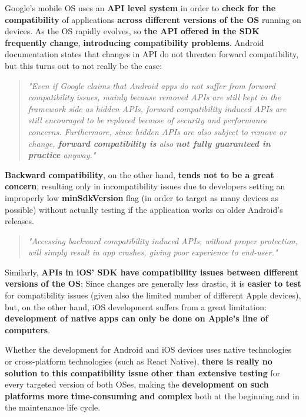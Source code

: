 Google's mobile OS uses an \textbf{API level system} in order to \textbf{check for the compatibility} of applications \textbf{across different versions of the OS} running on devices.
As the OS rapidly evolves, so \textbf{the API offered in the SDK frequently change}, \textbf{introducing compatibility problems}. Android documentation states that changes in API do not threaten forward compatibility, but this turns out to not really be the case:

\begin{quotation}
    \textit{"Even if Google claims that Android apps do not suffer from forward compatibility issues, mainly because removed APIs are still kept in the framework side as hidden APIs, forward compatibility induced APIs are still encouraged to be replaced because of security and performance concerns. Furthermore, since hidden APIs are also subject to remove or change, \textbf{forward compatibility is} also \textbf{not fully guaranteed in practice} anyway." \cite{automating_android_api_compatibility_issues}}
\end{quotation}

\textbf{Backward compatibility}, on the other hand, \textbf{tends not to be a great concern}, resulting only in incompatibility issues due to developers setting an improperly low \textbf{minSdkVersion} flag (in order to target as many devices as possible) without actually testing if the application works on older Android's releases.

\begin{quotation}
    \textit{"Accessing backward compatibility induced APIs, without proper protection, will simply result in app crashes, giving poor experience to end-user." \cite{automating_android_api_compatibility_issues}}
\end{quotation}

Similarly, \textbf{APIs in iOS' SDK have compatibility issues between different versions of the OS}; Since changes are generally less drastic, it is \textbf{easier to test} for compatibility issues (given also the limited number of different Apple devices), but, on the other hand, iOS development suffers from a great limitation: \textbf{development of native apps can only be done on Apple's line of computers}.

Whether the development for Android and iOS devices uses native technologies or cross-platform technologies (such as React Native), \textbf{there is really no solution to this compatibility issue other than extensive testing} for every targeted version of both OSes, making the \textbf{development on such platforms more time-consuming and complex} both at the beginning and in the maintenance life cycle.
